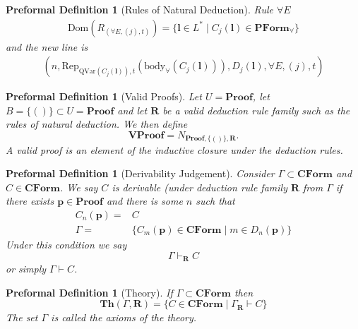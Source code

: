 \documentclass[oneside, 12pt]{book}
\theoremstyle{break}
\newtheorem{preformal definition}[definition]{Preformal Definition}
\newtheorem{preformal theorem}[theorem]{Preformal Theorem}
\newcommand{\bv}[1]{\boldsymbol{#1}}
\begin{document}
\begin{preformal definition}[Rules of Natural Deduction]
			Rule $\forall E$
			\begin{align*}
				\text{Dom}(R_{(\forall E, (j), t)}) = \{\bv{l} \in L^* \mid C_j(\bv{l}) \in \textbf{PForm}_{\forall}\}
			\end{align*}
			and the new line is
			\begin{align*}
				(n, \text{Rep}_{\text{QVar}(C_j(\bv{l})), t}(\text{body}_{\forall}(C_j(\bv{l}))), D_j(\bv{l}), \forall E, (j), t)
			\end{align*}
		\end{preformal definition}
	
		\begin{preformal definition}[Valid Proofs]
			Let $U = \textbf{Proof}$, let $B = \{()\} \subset U=\textbf{Proof}$ and let $\bv{R}$ be a valid deduction rule family such as the rules of natural deduction.
			We then define
			\begin{equation*}
				\textbf{VProof} = N_{\textbf{Proof}, \{()\}, \bv{R}}.
			\end{equation*}
			A valid proof is an element of the inductive closure under the deduction rules.
		\end{preformal definition}
		
		\begin{preformal definition}[Derivability Judgement]
			Consider $\Gamma \subset \textbf{CForm}$ and $C \in \textbf{CForm}$.
			We say $C$ is derivable (under deduction rule family $\bv{R}$ from $\Gamma$ if there exists $\bv{p} \in \textbf{Proof}$ and there is some $n$ such that 
			\begin{align*}
				C_n(\bv{p}) =& C\\
				\Gamma =& \{C_m(\bv{p}) \in \textbf{CForm} \mid m\in D_n(\bv{p})\}
			\end{align*}
			Under this condition we say
			\begin{equation*}
				\Gamma \vdash_{\bv{R}} C
			\end{equation*}
			or simply $\Gamma \vdash C$.
		\end{preformal definition}
		
		\begin{preformal definition}[Theory]
			If $\Gamma \subset \textbf{CForm}$ then
			\begin{equation*}
				\textbf{Th}(\Gamma, \bv{R}) = \{C \in \textbf{CForm} \mid \Gamma_{\bv{R}} \vdash C\}
			\end{equation*}
			The set $\Gamma$ is called the axioms of the theory.
		\end{preformal definition}
		
\end{document}
